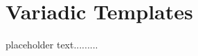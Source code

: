 \newpage
\section[Variadic Templates]{Variadic Templates}\label{variadictemplate}


placeholder text.........



